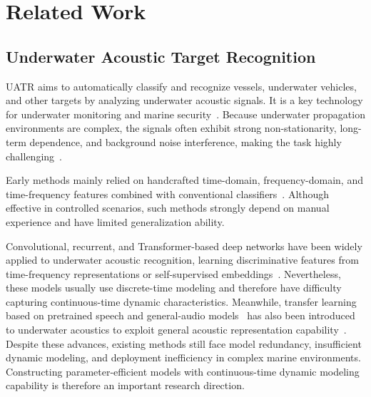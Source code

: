 ﻿\documentclass[lettersize,journal]{IEEEtran}
\begin{document}
\section{Related Work}
\subsection{Underwater Acoustic Target Recognition}
UATR aims to automatically classify and recognize vessels, underwater vehicles, and other targets by analyzing underwater acoustic signals. It is a key technology for underwater monitoring and marine security~\cite{David2016ShipsEar,Irfan2021DeepShip}. Because underwater propagation environments are complex, the signals often exhibit strong non-stationarity, long-term dependence, and background noise interference, making the task highly challenging~\cite{Urick1983,Jensen2011,Medwin2005}.

Early methods mainly relied on handcrafted time-domain, frequency-domain, and time-frequency features combined with conventional classifiers~\cite{David2016ShipsEar,Chen2021LOFAR}. Although effective in controlled scenarios, such methods strongly depend on manual experience and have limited generalization ability.

Convolutional, recurrent, and Transformer-based deep networks have been widely applied to underwater acoustic recognition, learning discriminative features from time-frequency representations or self-supervised embeddings~\cite{Chen2021LOFAR,TFTokenViT,MHTUATR}. Nevertheless, these models usually use discrete-time modeling and therefore have difficulty capturing continuous-time dynamic characteristics. Meanwhile, transfer learning based on pretrained speech and general-audio models~\cite{Baevski2020Wav2Vec2,Kong2020PANNs} has also been introduced to underwater acoustics to exploit general acoustic representation capability~\cite{ALSIUATR,CAFJTUATR}. Despite these advances, existing methods still face model redundancy, insufficient dynamic modeling, and deployment inefficiency in complex marine environments. Constructing parameter-efficient models with continuous-time dynamic modeling capability is therefore an important research direction.
\end{document}
